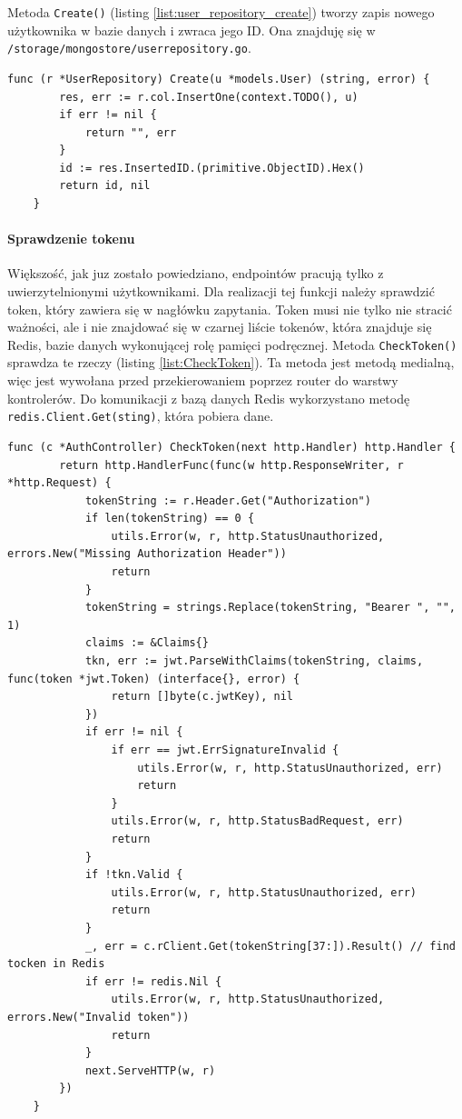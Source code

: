 Metoda \texttt{Create()} (listing \ref{list:user_repository_create}) tworzy zapis nowego użytkownika w bazie danych i zwraca jego ID.
Ona znajduję się w \texttt{/storage/mongostore/userrepository.go}.
\begin{lstlisting}[label=list:user_repository_create,caption=Zachowanie użytkownika do bazy danych,basicstyle=\tiny\ttfamily]
    func (r *UserRepository) Create(u *models.User) (string, error) {
        res, err := r.col.InsertOne(context.TODO(), u)
        if err != nil {
            return "", err
        }
        id := res.InsertedID.(primitive.ObjectID).Hex()
        return id, nil
    }
\end{lstlisting}

\paragraph{Sprawdzenie tokenu\newline}
Większość, jak juz zostało powiedziano, endpointów pracują tylko z uwierzytelnionymi użytkownikami. Dla realizacji tej funkcji należy sprawdzić token, który zawiera się w nagłówku zapytania.
Token musi nie tylko nie stracić ważności, ale i nie znajdować się w czarnej liście tokenów, która znajduje się Redis, bazie danych wykonującej rolę pamięci podręcznej.
Metoda \texttt{CheckToken()} sprawdza te rzeczy (listing \ref{list:CheckToken}). Ta metoda jest metodą medialną, więc jest wywołana przed przekierowaniem poprzez router do warstwy kontrolerów. Do komunikacji z bazą danych Redis wykorzystano metodę \texttt{redis.Client.Get(sting)}, która pobiera dane.
\begin{lstlisting}[label=list:CheckToken,caption=Walidacja JWT tokena,basicstyle=\tiny\ttfamily]
    func (c *AuthController) CheckToken(next http.Handler) http.Handler {
        return http.HandlerFunc(func(w http.ResponseWriter, r *http.Request) {
            tokenString := r.Header.Get("Authorization")
            if len(tokenString) == 0 {
                utils.Error(w, r, http.StatusUnauthorized, errors.New("Missing Authorization Header"))
                return
            }
            tokenString = strings.Replace(tokenString, "Bearer ", "", 1)
            claims := &Claims{}
            tkn, err := jwt.ParseWithClaims(tokenString, claims, func(token *jwt.Token) (interface{}, error) {
                return []byte(c.jwtKey), nil
            })
            if err != nil {
                if err == jwt.ErrSignatureInvalid {
                    utils.Error(w, r, http.StatusUnauthorized, err)
                    return
                }
                utils.Error(w, r, http.StatusBadRequest, err)
                return
            }
            if !tkn.Valid {
                utils.Error(w, r, http.StatusUnauthorized, err)
                return
            }
            _, err = c.rClient.Get(tokenString[37:]).Result() // find tocken in Redis
            if err != redis.Nil {
                utils.Error(w, r, http.StatusUnauthorized, errors.New("Invalid token"))
                return
            }
            next.ServeHTTP(w, r)
        })
    }
\end{lstlisting}

